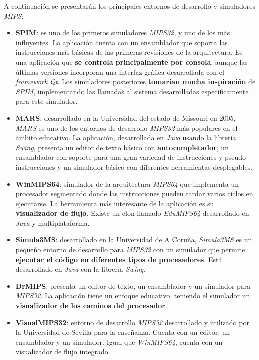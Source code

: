 A continuación se presentarán los principales
entornos de desarrollo y simuladores \textit{MIPS}:
\begin{itemize}
    \item \textbf{SPIM}\cite{SPIM}: es uno de los primeros simuladores
    \textit{MIPS32}, y uno de los más influyentes.
    La aplicación cuenta con un ensamblador que soporta las
    instrucciones más básicas de las primeras revisiones de la arquitectura.
    Es una aplicación que \textbf{se controla principalmente por consola},
    aunque las últimas versiones incorporan una interfaz gráfica
    desarrollada con el \textit{framework Qt}\cite{QT}.
    Los simuladores posteriores \textbf{tomarían mucha inspiración} de \textit{SPIM},
    implementando las llamadas al sistema desarrolladas específicamente
    para este simulador.
    \item \textbf{MARS}\cite{MARS}: desarrollado en la Universidad
    del estado de Missouri en 2005, \textit{MARS} es uno de los
    entornos de desarrollo \textit{MIPS32} más populares en el ámbito educativo.
    La aplicación, desarrollada en \textit{Java}\cite{JAVA}
    usando la librería \textit{Swing}\cite{SWING},
    presenta un editor de texto básico con \textbf{autocompletador}, un
    ensamblador con soporte para una gran variedad de instrucciones y
    pseudo-instrucciones y un simulador básico con diferentes herramientas
    desplegables.
    \item \textbf{WinMIPS64}\cite{WINMIPS64}: simulador
    de la arquitectura \textit{MIPS64} que implementa
    un procesador segmentado donde las instrucciones
    pueden tardar varios ciclos en ejecutarse.
    La herramienta más interesante de la aplicación
    es su \textbf{visualizador de flujo}.
    Existe un clon llamado \textit{EduMIPS64} desarrollado
    en \textit{Java} y multiplataforma.
    \item \textbf{Simula3MS}\cite{SIMULA3MS}: desarrollado en
    la Universidad de A Coruña, \textit{Simula3MS} es un
    pequeño entorno de desarrollo para \textit{MIPS32}
    con un simulador que permite \textbf{ejecutar el código en
    diferentes tipos de procesadores}.
    Está desarrollado en \textit{Java} con la librería \textit{Swing}.
    \item \textbf{DrMIPS}\cite{DRMIPS}: presenta un
    editor de texto, un ensamblador y un simulador
    para \textit{MIPS32}.
    La aplicación tiene un enfoque educativo, teniendo el simulador
    un \textbf{visualizador de los caminos del procesador}.
    \item \textbf{VisualMIPS32}\cite{VISUALMIPS32}: entorno
    de desarrollo \textit{MIPS32} desarrollado y
    utilizado por la Universidad de Sevilla para la enseñanza.
    Cuenta con un editor, un ensamblador y un simulador.
    Igual que \textit{WinMIPS64}, cuenta con un visualizador
    de flujo integrado.
\end{itemize}


